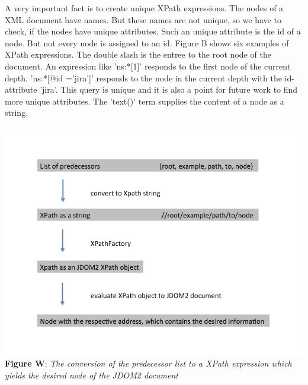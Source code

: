 A very important fact is to create unique XPath expressions. The nodes of a XML document have names. But these names are not unique, so we have to check, if the nodes have unique attributes. Such an unique attribute is the id of a node. But not every node is assigned to an id. Figure B shows six examples of XPath expressions. The double slash is the entree to the root node of the document. An expression like 'ns:*[1]' responds to the first node of the current depth. 'ns:*[@id ='jira']' responds to the node in the current depth with the id-attribute 'jira'. This query is unique and it is also a point for future work to find more unique attributes. The 'text()' term supplies the content of a node as a string. 
\\ \\ \includegraphics[width=1.0\textwidth]{list_to_xpath.png}  \\\textbf{Figure W}: \textit{The conversion of the predecessor list to a XPath expression which yields the desired node of the JDOM2 document}  \\ \\  

